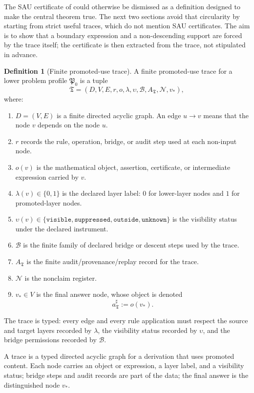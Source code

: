 \documentclass[11pt]{article}
\theoremstyle{definition}
\newtheorem{definition}[theorem]{Definition}
\begin{document}
The SAU certificate of  could otherwise be dismissed as a
definition designed to make the central theorem true.  The next two sections
avoid that circularity by starting from strict useful traces, which do not
mention SAU certificates.  The aim is to show that a boundary expression and a
non-descending support are forced by the trace itself; the certificate is then
extracted from the trace, not stipulated in advance.

\begin{definition}[Finite promoted-use trace]
\label{def:sau-promoted-use-trace}
A finite promoted-use trace for a lower problem profile \(\mathfrak P_0\) is a tuple
\[
\mathfrak T=(D,V,E,r,o,\lambda,\upsilon,\mathcal B,A_{\mathfrak T},\mathcal N,v_\ast),
\]
where:
\begin{enumerate}
\item \(D=(V,E)\) is a finite directed acyclic graph.  An edge \(u\to v\) means that the node \(v\) depends on the node \(u\).
\item \(r\) records the rule, operation, bridge, or audit step used at each non-input node.
\item \(o(v)\) is the mathematical object, assertion, certificate, or intermediate expression carried by \(v\).
\item \(\lambda(v)\in\{0,1\}\) is the declared layer label: \(0\) for lower-layer nodes and \(1\) for promoted-layer nodes.
\item \(\upsilon(v)\in\{\texttt{visible},\texttt{suppressed},\texttt{outside},\texttt{unknown}\}\) is the visibility status under the declared instrument.
\item \(\mathcal B\) is the finite family of declared bridge or descent steps used by the trace.
\item \(A_{\mathfrak T}\) is the finite audit/provenance/replay record for the trace.
\item \(\mathcal N\) is the nonclaim register.
\item \(v_\ast\in V\) is the final answer node, whose object is denoted
\[
a^\sharp_{\mathfrak T}:=o(v_\ast).
\]
\end{enumerate}
The trace is typed: every edge and every rule application must respect the source and target layers recorded by \(\lambda\), the visibility status recorded by \(\upsilon\), and the bridge permissions recorded by \(\mathcal B\).
\end{definition}

A trace is a typed directed acyclic graph for a derivation that uses promoted
content.  Each node carries an object or expression, a layer label, and a
visibility status; bridge steps and audit records are part of the data; the
final answer is the distinguished node \(v_\ast\).
\end{document}
